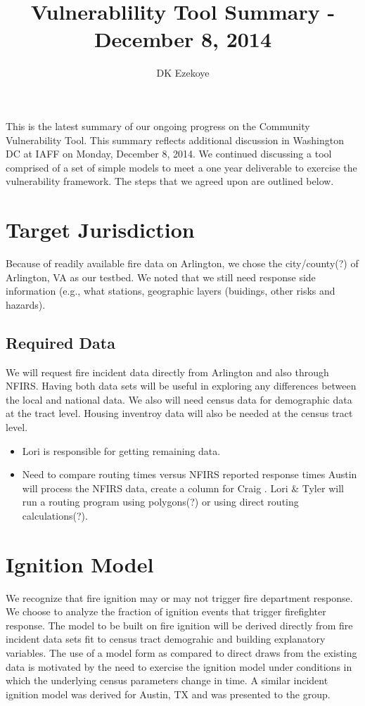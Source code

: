 \documentclass[12pt,oneside]{article}
\title{Vulnerablility  Tool  Summary - December 8, 2014}
\author{DK Ezekoye}
\begin{document}
\maketitle

This is the latest summary of our ongoing progress on the Community Vulnerability Tool. This summary reflects additional discussion in Washington DC at IAFF on Monday, December 8, 2014.  We continued discussing a  tool comprised of a set of simple models to meet a one year deliverable to exercise the vulnerability framework. The steps that we agreed upon are outlined below.

\section{Target Jurisdiction}

Because of readily available fire data on Arlington, we chose the city/county(?)  of Arlington, VA as our testbed. 
We noted that we still need response side information (e.g., what stations, geographic layers (buidings, other risks and hazards).


\subsection{Required Data}

We will request fire incident data directly from Arlington and also through NFIRS. Having both data sets will be useful in exploring any differences between the local and national data. We also will need census data for demographic data at the tract level.  Housing inventroy data will also be needed at the census tract level.

\begin{itemize}
\item Lori is responsible for getting remaining data.
\item Need to compare routing times versus NFIRS reported response times Austin will process the NFIRS  data, create a column for Craig . Lori \& Tyler will run a routing program using polygons(?) or using direct routing calculations(?).  
\end{itemize}

\section{Ignition Model}

We recognize that fire ignition may or may not trigger fire department response. We choose to analyze the fraction of ignition events that trigger firefighter response. The model to be built on fire ignition will be derived directly from fire incident data sets fit to census tract demograhic and building explanatory variables.  The use of a model form as compared to direct draws from the existing data is motivated by the need to exercise the ignition model under conditions in which the underlying census parameters change in time.  A similar incident ignition model was derived for Austin, TX and was presented to the group.
\end{document}
